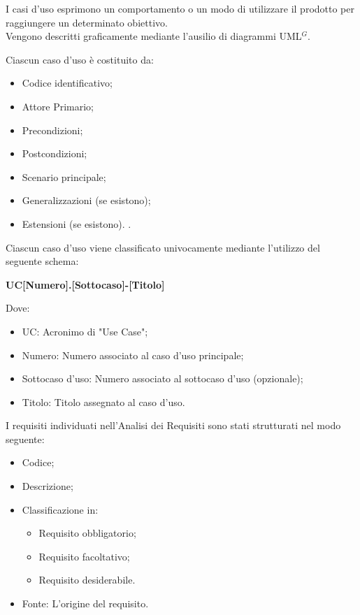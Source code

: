 

    I casi d’uso esprimono un comportamento o un modo di utilizzare il prodotto per raggiungere un determinato obiettivo. \\
    Vengono descritti graficamente mediante l’ausilio di diagrammi UML$^{G}$.

    Ciascun caso d’uso è costituito da:
    \begin{itemize}
        \item Codice identificativo;
        \item Attore Primario;
        \item Precondizioni;
        \item Postcondizioni;
        \item Scenario principale;
        \item Generalizzazioni (se esistono);
        \item Estensioni (se esistono). .
    \end{itemize}


    Ciascun caso d’uso viene classificato univocamente mediante l’utilizzo del seguente schema:

        \begin{center}
            \large{\textbf{UC[Numero].[Sottocaso]-[Titolo]}}
        \end{center}
    Dove:
    \begin{itemize}
        \item UC: Acronimo di "Use Case";
        \item Numero: Numero associato al caso d'uso principale;
        \item Sottocaso d'uso: Numero associato al sottocaso d'uso (opzionale);
        \item Titolo: Titolo assegnato al caso d'uso.
    \end{itemize}


    I requisiti individuati nell’Analisi dei Requisiti sono stati strutturati nel modo seguente:

    \begin{itemize}
        \item Codice;
        \item Descrizione;
        \item Classificazione in: \begin{itemize};
                                        \item Requisito obbligatorio;
                                        \item Requisito facoltativo;
                                        \item Requisito desiderabile.
        \end{itemize}
        \item Fonte: L'origine del requisito.
    \end{itemize}

